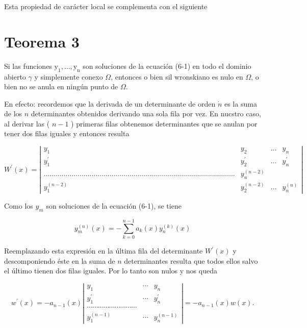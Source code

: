 \documentclass[10pt]{article}
\theoremstyle{plain}
\theoremstyle{definition}
\theoremstyle{remark}
\begin{document}
Esta propiedad de carácter local se complementa con el siguiente

\section*{Teorema 3}
Si las funciones $\mathrm{y}_{1}, \ldots, \mathrm{y}_{\mathrm{n}}$ son soluciones de la ecuación (6-1) en todo el dominio abierto $\gamma$ y simplemente conexo $\Omega$, entonces o bien sil wronskiano es nulo en $\Omega$, o bien no se anula en ningún punto de $\Omega$.

En efecto: recordemos que la derivada de un determinante de orden $\dot{n}$ es la suma de los $n$ determinantes obtenidos derivando una sola fila por vez. En nucstro caso, al derivar las ( $n-1$ ) primeras filas obtenemos determinantes que se anulan por tener dos filas iguales y entonces resulta

$$
W^{\prime}(x)=\left|\begin{array}{cccc}
y_{1} & y_{2} & \ldots & y_{n} \\
y_{1}^{\prime} & y_{2}^{\prime} & \ldots & y_{n}^{\prime} \\
\ldots \ldots \ldots \ldots \ldots \ldots \ldots \ldots \ldots \ldots \ldots \ldots \ldots \ldots \ldots \ldots \ldots \ldots \ldots \ldots \ldots \ldots \ldots \ldots \ldots \ldots \ldots \ldots \ldots \ldots \ldots \ldots & y_{n}^{(n-2)} \\
y_{1}^{(n-2)} & y_{2}^{(n-2)} & \ldots & y_{n}^{(n)}
\end{array}\right|
$$

Como los $y_{m}$ son soluciones de la ecuación (6-1), se tiene

$$
y_{m}^{(n)}(x)=-\sum_{k=0}^{n-1} a_{k}(x) y_{n}^{(k)}(x)
$$

Reemplazando esta expresión en la última fila del determinante $W^{\prime}(x)$ y descomponiendo éste en la suma de $n$ determinantes resulta que todos ellos salvo el último tienen dos filas iguales. Por lo tanto son nulos y nos queda

$$
w^{\prime}(x)=-a_{n-1}(x)\left|\begin{array}{ccc}
y_{1} & \cdots & y_{n} \\
y_{1}^{\prime} & \cdots & y_{n}^{\prime} \\
\cdots \cdots \cdots \cdots \cdots \cdots \cdots \cdots \cdots \\
y_{1}^{(n-1)} & \cdots & y_{n}^{(n-1)}
\end{array}\right|=-a_{n-1}(x) w(x) .
$$
\end{document}
